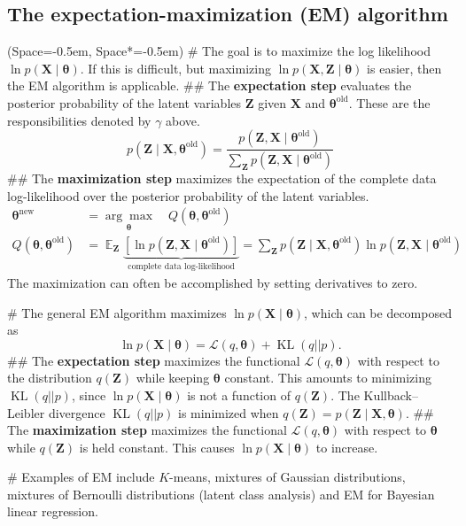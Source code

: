 \documentclass[12pt, a4paper]{article}
\newcommand{\listSpace}{-0.5em}%
\newcommand{\vect}[1]{\bm{#1}}
\DeclareMathOperator{\E}{\mathbb{E}}
\begin{document}
\subsection*{The expectation-maximization (EM) algorithm}
\begin{easylist}[itemize]
	\ListProperties(Space=\listSpace, Space*=\listSpace)
	# The goal is to maximize the log likelihood $\ln p(\vect{X} \mid \vect{\theta})$.
	If this is difficult, but maximizing $\ln p(\vect{X}, \vect{Z} \mid \vect{\theta})$ is easier, then the EM algorithm is applicable.
	## The \textbf{expectation step} evaluates the posterior probability of the latent variables $\vect{Z}$ given $\vect{X}$ and $\vect{\theta}^{\text{old}}$.
	These are the responsibilities denoted by $\gamma$ above.
	\begin{equation*}
		p(\vect{Z} \mid \vect{X}, \vect{\theta}^{\text{old}})
		=
		\frac{
			p(\vect{Z} , \vect{X} \mid \vect{\theta}^{\text{old}})
			}{
			\sum_{\vect{Z}} p(\vect{Z} , \vect{X} \mid \vect{\theta}^{\text{old}})}
	\end{equation*}
	## The \textbf{maximization step} maximizes the expectation of the complete data log-likelihood over the posterior probability of the latent variables.
	\begin{align*}
		\vect{\theta}^{\text{new}} &= \underset{\vect{\theta}}{\arg \max} \quad 
		Q(\vect{\theta}, \vect{\theta}^{\text{old}})
		\\
		Q(\vect{\theta}, \vect{\theta}^{\text{old}}) &= 
		\E_{\vect{Z}}
		\underbrace{ \left[ 
			\ln p(\vect{Z} , \vect{X} \mid \vect{\theta}^{\text{old}})
			\right]
			}_{\text{complete data log-likelihood}}
		= \sum_{\vect{Z}}
		p(\vect{Z} \mid \vect{X}, \vect{\theta}^{\text{old}})
		  \ln p(\vect{Z} , \vect{X} \mid \vect{\theta}^{\text{old}})
	\end{align*}
	The maximization can often be accomplished by setting derivatives to zero.
	
	# The general EM algorithm maximizes $\ln p(\vect{X} \mid \vect{\theta})$, which can be decomposed as
	\begin{equation*}
		\ln p(\vect{X} \mid \vect{\theta})
		=
		\mathcal{L}(q, \vect{\theta})
		+
		\operatorname{KL}(q ||  p).
	\end{equation*}
	## The \textbf{expectation step} maximizes the functional $\mathcal{L}(q, \vect{\theta})$ with respect to the distribution $q(\vect{Z})$ while keeping $\vect{\theta}$ constant.
	This amounts to minimizing $\operatorname{KL}(q ||  p)$, since $\ln p(\vect{X} \mid \vect{\theta})$ is not a function of $q(\vect{Z})$.
	The Kullback–Leibler divergence $\operatorname{KL}(q ||  p)$ is minimized when $q(\vect{Z}) = p(\vect{Z} \mid \vect{X}, \vect{\theta})$.
	## The \textbf{maximization step} maximizes the functional $\mathcal{L}(q, \vect{\theta})$ with respect to $\vect{\theta}$ while $q(\vect{Z})$ is held constant.
	This causes $\ln p(\vect{X} \mid \vect{\theta})$ to increase.
	
	# Examples of EM include 
	$K$-means,
	mixtures of Gaussian distributions,
	mixtures of Bernoulli distributions (latent class analysis)
	and EM for Bayesian linear regression.
\end{easylist}
\end{document}
